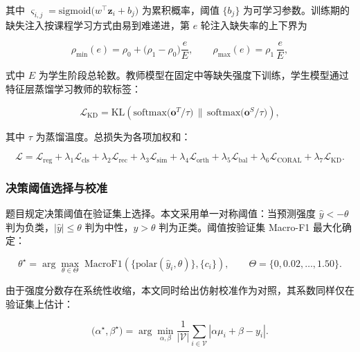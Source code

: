 \documentclass[withoutpreface,bwprint]{cumcmthesis}
\begin{document}
其中 $\varsigma_{i,j}=\mathrm{sigmoid}\big(w^{\top}\bm{z}_i+b_j\big)$ 为累积概率，阈值 $\{b_j\}$ 为可学习参数。训练期的缺失注入按课程学习方式由易到难递进，第 $e$ 轮注入缺失率的上下界为

\begin{equation}
\rho_{\min}(e)=\rho_0+\big(\rho_1-\rho_0\big)\frac{e}{E},\qquad
\rho_{\max}(e)=\rho_1\,\frac{e}{E},
\label{eq:curriculum}
\end{equation}

式中 $E$ 为学生阶段总轮数。教师模型在固定中等缺失强度下训练，学生模型通过特征层蒸馏学习教师的软标签：

\begin{equation}
\mathcal{L}_{\mathrm{KD}}=\mathrm{KL}\!\left(
\mathrm{softmax}\big(\bm{o}^{T}/\tau\big)\,\big\|\,
\mathrm{softmax}\big(\bm{o}^{S}/\tau\big)\right),
\label{eq:kd}
\end{equation}

其中 $\tau$ 为蒸馏温度。总损失为各项加权和：

\begin{equation}
\mathcal{L}=\mathcal{L}_{\mathrm{reg}}+\lambda_1\mathcal{L}_{\mathrm{cls}}
+\lambda_2\mathcal{L}_{\mathrm{rec}}+\lambda_3\mathcal{L}_{\mathrm{sim}}
+\lambda_4\mathcal{L}_{\mathrm{orth}}+\lambda_5\mathcal{L}_{\mathrm{bal}}
+\lambda_6\mathcal{L}_{\mathrm{CORAL}}+\lambda_7\mathcal{L}_{\mathrm{KD}}.
\label{eq:total}
\end{equation}

\subsubsection{决策阈值选择与校准}

题目规定决策阈值在验证集上选择。本文采用单一对称阈值：当预测强度 $\hat{y}<-\theta$ 判为负类，$|\hat{y}|\le\theta$ 判为中性，$\hat{y}>\theta$ 判为正类。阈值按验证集 Macro-F1 最大化确定：

\begin{equation}
\theta^{\star}=\arg\max_{\theta\in\Theta}\;
\mathrm{MacroF1}\!\left(\big\{\mathrm{polar}(\hat{y}_i,\theta)\big\},\{c_i\}\right),\qquad
\Theta=\{0,0.02,\dots,1.50\}.
\label{eq:theta}
\end{equation}

由于强度分数存在系统性收缩，本文同时给出仿射校准作为对照，其系数同样仅在验证集上估计：

\begin{equation}
\big(\alpha^{\star},\beta^{\star}\big)=\arg\min_{\alpha,\beta}
\frac{1}{|\mathcal{V}|}\sum_{i\in\mathcal{V}}\left|\alpha\mu_i+\beta-y_i\right|.
\label{eq:calib}
\end{equation}
\end{document}
